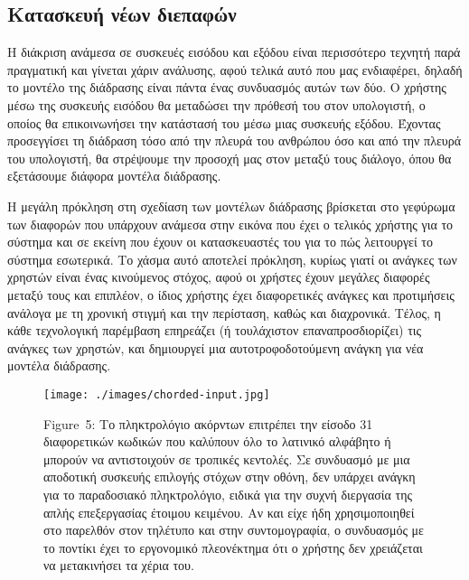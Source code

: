 \documentclass[
]{article}
\begin{document}
\hypertarget{ux3baux3b1ux3c4ux3b1ux3c3ux3baux3b5ux3c5ux3ae-ux3bdux3adux3c9ux3bd-ux3b4ux3b9ux3b5ux3c0ux3b1ux3c6ux3ceux3bd}{%
\subsection{Κατασκευή νέων
διεπαφών}\label{ux3baux3b1ux3c4ux3b1ux3c3ux3baux3b5ux3c5ux3ae-ux3bdux3adux3c9ux3bd-ux3b4ux3b9ux3b5ux3c0ux3b1ux3c6ux3ceux3bd}}

Η διάκριση ανάμεσα σε συσκευές εισόδου και εξόδου είναι περισσότερο
τεχνητή παρά πραγματική και γίνεται χάριν ανάλυσης, αφού τελικά αυτό που
μας ενδιαφέρει, δηλαδή το μοντέλο της διάδρασης είναι πάντα ένας
συνδυασμός αυτών των δύο. Ο χρήστης μέσω της συσκευής εισόδου θα
μεταδώσει την πρόθεσή του στον υπολογιστή, ο οποίος θα επικοινωνήσει την
κατάστασή του μέσω μιας συσκευής εξόδου. Έχοντας προσεγγίσει τη διάδραση
τόσο από την πλευρά του ανθρώπου όσο και από την πλευρά του υπολογιστή,
θα στρέψουμε την προσοχή μας στον μεταξύ τους διάλογο, όπου θα
εξετάσουμε διάφορα μοντέλα διάδρασης.

Η μεγάλη πρόκληση στη σχεδίαση των μοντέλων διάδρασης βρίσκεται στο
γεφύρωμα των διαφορών που υπάρχουν ανάμεσα στην εικόνα που έχει ο
τελικός χρήστης για το σύστημα και σε εκείνη που έχουν οι κατασκευαστές
του για το πώς λειτουργεί το σύστημα εσωτερικά. Το χάσμα αυτό αποτελεί
πρόκληση, κυρίως γιατί οι ανάγκες των χρηστών είναι ένας κινούμενος
στόχος, αφού οι χρήστες έχουν μεγάλες διαφορές μεταξύ τους και επιπλέον,
ο ίδιος χρήστης έχει διαφορετικές ανάγκες και προτιμήσεις ανάλογα με τη
χρονική στιγμή και την περίσταση, καθώς και διαχρονικά. Τέλος, η κάθε
τεχνολογική παρέμβαση επηρεάζει (ή τουλάχιστον επαναπροσδιορίζει) τις
ανάγκες των χρηστών, και δημιουργεί μια αυτοτροφοδοτούμενη ανάγκη για
νέα μοντέλα διάδρασης.

\leavevmode{}%
\begin{figure}
\hypertarget{fig:chorded-input}{%
\centering
\texttt{[image: ./images/chorded-input.jpg]}
\caption{Figure~5: Το πληκτρολόγιο ακόρντων επιτρέπει την είσοδο 31
διαφορετικών κωδικών που καλύπουν όλο το λατινικό αλφάβητο ή μπορούν να
αντιστοιχούν σε τροπικές κεντολές. Σε συνδυασμό με μια αποδοτική
συσκευής επιλογής στόχων στην οθόνη, δεν υπάρχει ανάγκη για το
παραδοσιακό πληκτρολόγιο, ειδικά για την συχνή διεργασία της απλής
επεξεργασίας έτοιμου κειμένου. Αν και είχε ήδη χρησιμοποιηθεί στο
παρελθόν στον τηλέτυπο και στην συντομογραφία, ο συνδυασμός με το
ποντίκι έχει το εργονομικό πλεονέκτημα ότι ο χρήστης δεν χρειάζεται να
μετακινήσει τα χέρια του.}\label{fig:chorded-input}
}
\end{figure}
\end{document}
